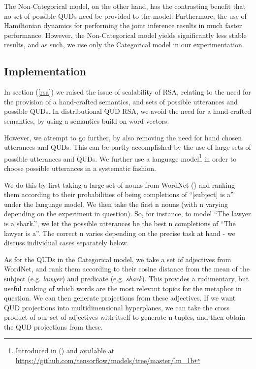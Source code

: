 \documentclass[10pt,letterpaper,twocolumn]{article}
\begin{document}
The Non-Categorical model, on the other hand, has the contrasting benefit that no set of possible QUDs need be provided to the model. Furthermore, the use of Hamiltonian dynamics for performing the joint inference results in much faster performance. However, the Non-Categorical model yields significantly less stable results, and as such, we use only the Categorical model in our experimentation.




\subsection{Implementation} \label{implementation}

In section (\ref{rsa}) we raised the issue of scalability of RSA, relating to the need for the provision of a hand-crafted semantics, and sets of possible utterances and possible QUDs. In distributional QUD RSA, we avoid the need for a hand-crafted semantics, by using a semantics build on word vectors.

However, we attempt to go further, by also removing the need for hand chosen utterances and QUDs. This can be partly accomplished by the use of large sets of possible utterances and QUDs. We further use a language model\footnote{Introduced in (\cite{jozefowicz2016exploring}) and available at \url{https://github.com/tensorflow/models/tree/master/lm_1b}} in order to choose possible utterances in a systematic fashion.

We do this by first taking a large set of nouns from WordNet (\cite{miller1995wordnet}) and ranking them according to their probabilities of being completions of ``[subject] is a'' under the language model. We then take the first n nouns (with n varying depending on the experiment in question). So, for instance, to model ``The lawyer is a shark.'', we let the possible utterances be the best n completions of ``The lawyer is a''. The correct n varies depending on the precise task at hand - we discuss individual cases separately below. 

As for the QUDs in the Categorical model, we take a set of adjectives from WordNet, and rank them according to their cosine distance from the mean of the subject (e.g. \emph{lawyer}) and predicate (e.g. \emph{shark}). This provides a rudimentary, but useful ranking of which words are the most relevant topics for the metaphor in question. We can then generate projections from these adjectives. If we want QUD projections into multidimensional hyperplanes, we can take the cross product of our set of adjectives with itself to generate n-tuples, and then obtain the QUD projections from these.
\end{document}
